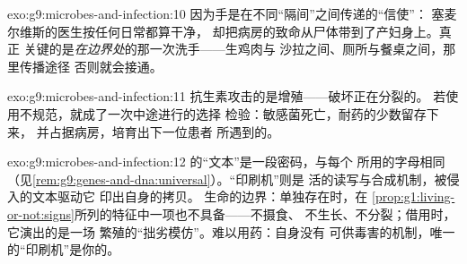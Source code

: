 \begin{solution}{exo:g9:microbes-and-infection:10}
因为手是在不同“隔间”之间传递的“信使”：
塞麦尔维斯的医生按任何日常都算干净，
却把病房的致命从尸体带到了产妇身上。真正
关键的是\emph{在边界处}的那一次洗手——生鸡肉与
沙拉之间、厕所与餐桌之间，那里传播途径
否则就会接通。
\end{solution}

\begin{solution}{exo:g9:microbes-and-infection:11}
抗生素攻击的是增殖——破坏正在分裂的。
若使用不规范，就成了一次中途进行的选择
检验：敏感菌死亡，耐药的少数留存下来，
并占据病房，培育出下一位患者
所遇到的。
\end{solution}

\begin{solution}{exo:g9:microbes-and-infection:12}
的“文本”是一段密码，与每个
所用的字母相同（见\cref{rem:g9:genes-and-dna:universal}）。“印刷机”则是
活的读写与合成机制，被侵入的文本驱动它
印出自身的拷贝。
生命的边界：单独存在时，在
\cref{prop:g1:living-or-not:signs}所列的特征中一项也不具备——不摄食、
不生长、不分裂；借用时，它演出的是一场
繁殖的“拙劣模仿”。难以用药：自身没有
可供毒害的机制，唯一的“印刷机”是你的。
\end{solution}

